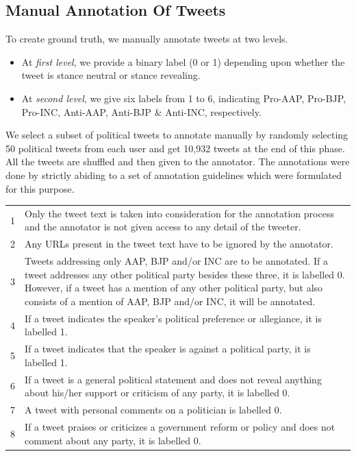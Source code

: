 \documentclass[a0,portrait]{a0poster}
\begin{document}
\begin{multicols}{2}
\subsection*{Manual Annotation Of Tweets}
To create ground truth, we manually annotate tweets at two levels. 
\begin{itemize}
    \item At \textit{first level}, we provide a binary label (0 or 1) depending upon whether the tweet is stance neutral or stance revealing.
    \item At \textit{second level}, we give six labels from 1 to 6, indicating Pro-AAP, Pro-BJP, Pro-INC, Anti-AAP, Anti-BJP \& Anti-INC, respectively.
\end{itemize} 
We select a subset of political tweets to annotate manually by randomly selecting 50 political tweets from each user and get 10,932 tweets at the end of this phase. All the tweets are shuffled and then given to the annotator. The annotations were done by strictly abiding to a set of annotation guidelines which were formulated for this purpose.
\begin{center}\vspace{1cm}
\begin{tabular}{l p{35cm} }
\toprule
1 & Only the tweet text is taken into consideration for the annotation process and the annotator is not given access to any detail of the tweeter.\\
2 & Any URLs present in the tweet text have to be ignored by the annotator.\\
3 & Tweets addressing only AAP, BJP and/or INC are to be annotated. If a tweet addresses any other political party besides these three, it is labelled 0. However, if a tweet has a mention of any other political party, but also consists of a mention of AAP, BJP and/or INC, it will be annotated.\\ 
4 & If a tweet indicates the speaker's political preference or allegiance, it is labelled 1.\\
5 & If a tweet indicates that the speaker is against a political party, it is labelled 1.\\ 
6 & If a tweet is a general political statement and does not reveal anything about his/her support or criticism of any party, it is labelled 0.\\
7 & A tweet with personal comments on a politician is labelled 0.\\
8 & If a tweet praises or criticizes a government reform or policy and does not comment about any party, it is labelled 0.\\
\bottomrule
\end{tabular}
\end{center}


\end{multicols}
\end{document}
